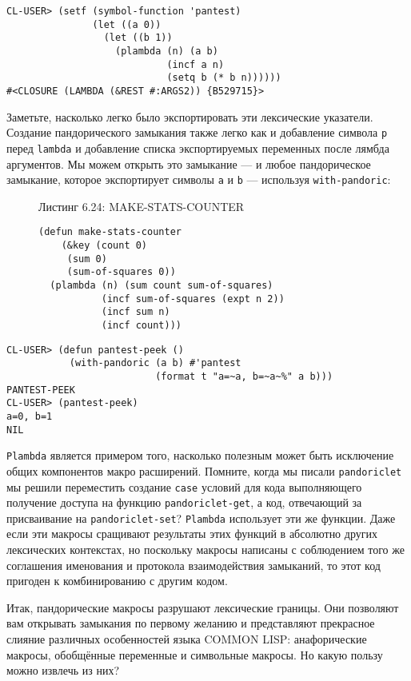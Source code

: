 \begin{verbatim}
CL-USER> (setf (symbol-function 'pantest)
               (let ((a 0))
                 (let ((b 1))
                   (plambda (n) (a b)
                            (incf a n)
                            (setq b (* b n))))))
#<CLOSURE (LAMBDA (&REST #:ARGS2)) {B529715}>
\end{verbatim}

Заметьте, насколько легко было экспортировать эти лексические указатели. Создание пандорического замыкания также легко как и добавление символа \verb"p" перед \verb"lambda" и добавление списка экспортируемых переменных после лямбда аргументов. Мы можем открыть это замыкание --- и любое пандорическое замыкание, которое экспортирует символы \verb"a" и \verb"b" --- используя \verb"with-pandoric":

\begin{figure}Листинг 6.24: MAKE-STATS-COUNTER\label{listing_6.24}
\listbegin
\begin{verbatim}
(defun make-stats-counter
    (&key (count 0)
     (sum 0)
     (sum-of-squares 0))
  (plambda (n) (sum count sum-of-squares)
           (incf sum-of-squares (expt n 2))
           (incf sum n)
           (incf count)))
\end{verbatim}
\listend
\end{figure}

\begin{verbatim}
CL-USER> (defun pantest-peek ()
           (with-pandoric (a b) #'pantest
                          (format t "a=~a, b=~a~%" a b)))
PANTEST-PEEK
CL-USER> (pantest-peek)
a=0, b=1
NIL
\end{verbatim}

\verb"Plambda" является примером того, насколько полезным может быть исключение общих компонентов макро расширений. Помните, когда мы писали \verb"pandoriclet" мы решили переместить создание \verb"case" условий для кода выполняющего получение доступа на функцию \verb"pandoriclet-get", а код, отвечающий за присваивание на \verb"pandoriclet-set"? \verb"Plambda" использует эти же функции. Даже если эти макросы сращивают результаты этих функций в абсолютно других лексических контекстах, но поскольку макросы написаны с соблюдением того же соглашения именования и протокола взаимодействия замыканий, то этот код пригоден к комбинированию с другим кодом.

Итак, пандорические макросы разрушают лексические границы. Они позволяют вам открывать замыкания по первому желанию и представляют прекрасное слияние различных особенностей языка COMMON LISP: анафорические макросы, обобщённые переменные и символьные макросы. Но какую пользу можно извлечь из них?

